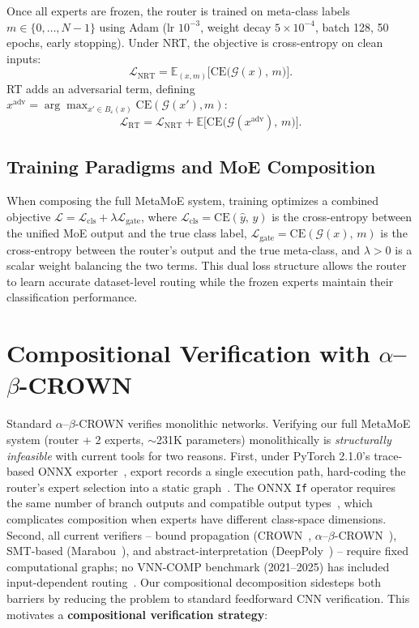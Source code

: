 \documentclass[runningheads]{llncs}
\begin{document}
Once all experts are frozen, the router is trained on meta-class labels $m \in \{0, \ldots, N{-}1\}$ using Adam (lr $10^{-3}$, weight decay $5 \times 10^{-4}$, batch 128, 50 epochs, early stopping). Under NRT, the objective is cross-entropy on clean inputs:
\begin{equation}
\mathcal{L}_{\text{NRT}} = \mathbb{E}_{(x,m)}\!\bigl[\text{CE}\!\bigl(\mathcal{G}(x),\, m\bigr)\bigr].
\end{equation}
RT adds an adversarial term, defining
$x^{\text{adv}} \!=\! \arg\max_{x'\in B_\varepsilon(x)} \text{CE}(\mathcal{G}(x'),m)$:
\begin{equation}
\mathcal{L}_{\text{RT}} = \mathcal{L}_{\text{NRT}} + \mathbb{E}\!\bigl[\text{CE}\!\bigl(\mathcal{G}(x^{\text{adv}}),\, m\bigr)\bigr].
\end{equation}

\subsection{Training Paradigms and MoE Composition}

When composing the full \textsf{MetaMoE} system, training optimizes a combined objective $\mathcal{L} = \mathcal{L}_{\text{cls}} + \lambda \mathcal{L}_{\text{gate}}$, where $\mathcal{L}_{\text{cls}} = \text{CE}(\hat{y},\, y)$ is the cross-entropy between the unified MoE output and the true class label, $\mathcal{L}_{\text{gate}} = \text{CE}(\mathcal{G}(x),\, m)$ is the cross-entropy between the router's output and the true meta-class, and $\lambda > 0$ is a scalar weight balancing the two terms. This dual loss structure allows the router to learn accurate dataset-level routing while the frozen experts maintain their classification performance.

\section{Compositional Verification with $\alpha$--$\beta$-CROWN}

Standard $\alpha$--$\beta$-CROWN verifies monolithic networks. Verifying our full \textsf{MetaMoE} system (router + 2 experts, ${\sim}$231K parameters) monolithically is \emph{structurally infeasible} with current tools for two reasons. First, under PyTorch 2.1.0's trace-based ONNX exporter~\cite{pytorchonnx}, export records a single execution path, hard-coding the router's expert selection into a static graph~\cite{pytorchcontrolflow}. The ONNX \texttt{If} operator requires the same number of branch outputs and compatible output types~\cite{onnxir,pytorchcontrolflow}, which complicates composition when experts have different class-space dimensions. Second, all current verifiers -- bound propagation (CROWN~\cite{xu2020abcrown}, $\alpha$--$\beta$-CROWN~\cite{wang2021}), SMT-based (Marabou~\cite{wu2024marabou}), and abstract-interpretation (DeepPoly~\cite{singh2019eran}) -- require fixed computational graphs; no VNN-COMP benchmark (2021--2025) has included input-dependent routing~\cite{kaulen2025}. Our compositional decomposition sidesteps both barriers by reducing the problem to standard feedforward CNN verification. This motivates a \textbf{compositional verification strategy}:
\end{document}
